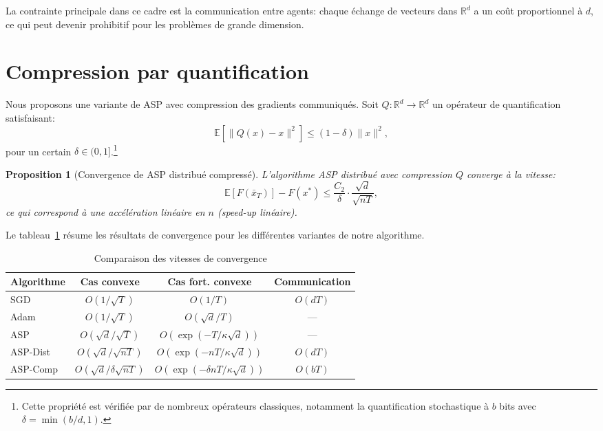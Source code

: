\documentclass[12pt,a4paper]{report}
\newtheorem{proposition}[theoreme]{Proposition}
\begin{document}
La contrainte principale dans ce cadre est la communication entre agents:
chaque \'echange de vecteurs dans $\mathbb{R}^d$ a un co\^ut proportionnel
\`a $d$, ce qui peut devenir prohibitif pour les probl\`emes de grande
dimension.

\section{Compression par quantification}

Nous proposons une variante de ASP avec compression des gradients
communiqu\'es. Soit $Q : \mathbb{R}^d \to \mathbb{R}^d$ un op\'erateur
de quantification satisfaisant:
\begin{equation}
  \mathbb{E}[\|Q(x) - x\|^2] \leq (1-\delta) \|x\|^2,
\end{equation}
pour un certain $\delta \in (0, 1]$.\footnote{Cette propri\'et\'e est
v\'erifi\'ee par de nombreux op\'erateurs classiques, notamment la
quantification stochastique \`a $b$ bits avec $\delta = \min(b/d, 1)$.}

\begin{proposition}[Convergence de ASP distribu\'e compress\'e]
L'algorithme ASP distribu\'e avec compression $Q$ converge \`a la vitesse:
\begin{equation}
  \mathbb{E}[F(\bar{x}_T)] - F(x^*) \leq
    \frac{C_2}{\delta} \cdot \frac{\sqrt{d}}{\sqrt{nT}},
\end{equation}
ce qui correspond \`a une acc\'el\'eration lin\'eaire en $n$ (speed-up
lin\'eaire).
\end{proposition}

Le tableau~\ref{tab:comparison} r\'esume les r\'esultats de convergence
pour les diff\'erentes variantes de notre algorithme.

\begin{table}[htbp]
\centering
\caption{Comparaison des vitesses de convergence}\label{tab:comparison}
\begin{tabular}{@{}lccc@{}}
\toprule
Algorithme & Cas convexe & Cas fort. convexe & Communication \\
\midrule
SGD        & $O(1/\sqrt{T})$ & $O(1/T)$ & $O(dT)$ \\
Adam       & $O(1/\sqrt{T})$ & $O(\sqrt{d}/T)$ & --- \\
ASP        & $O(\sqrt{d}/\sqrt{T})$ & $O(\exp(-T/\kappa\sqrt{d}))$ & --- \\
ASP-Dist   & $O(\sqrt{d}/\sqrt{nT})$ & $O(\exp(-nT/\kappa\sqrt{d}))$ & $O(dT)$ \\
ASP-Comp   & $O(\sqrt{d}/\delta\sqrt{nT})$ & $O(\exp(-\delta nT/\kappa\sqrt{d}))$ & $O(bT)$ \\
\bottomrule
\end{tabular}
\end{table}
\end{document}
